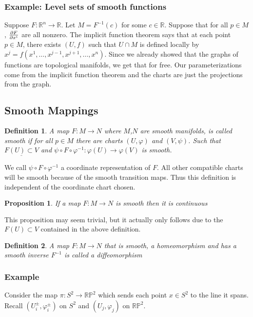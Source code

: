 \documentclass[a4paper]{article}
\newtheorem*{prop}{Proposition}
\newtheorem*{defn}{Definition}
\begin{document}
\subsubsection*{Example: Level sets of smooth functions}%
\label{ssub:Example: Level sets of smooth functions}
Suppose $F: \mathds{R}^n \rightarrow \mathds{R}$. Let $M = F^{-1}(c)$ for some $c \in \mathds{R}$. Suppose that for all $p \in M$, $\pdv{F}{x^i}$ are all nonzero. The implicit function theorem says that at each point $p \in M$, there exists $(U,f)$ such that $U \cap M$ is defined locally by $x^j = f(x^1, \dots, x^{j-1}, x^{j+1}, \dots, x^n)$. Since we already showed that the graphs of functions are topological manifolds, we get that for free. Our parameterizations come from the implicit function theorem and the charts are just the projections from the graph.

\subsection*{Smooth Mappings}%
\label{sub:Smooth Mappings}

\begin{defn}
  A map $F: M \rightarrow N$ where $M$,$N$ are smooth manifolds, is called smooth if for all $p \in M$ there are charts $(U, \varphi)$ and $(V, \psi)$.  Such that $\underline{F(U) \subset V}$ and $\psi \circ F \circ \varphi^{-1}: \varphi(U) \rightarrow \varphi(V)$ is smooth.
\end{defn}
We call $\psi \circ F \circ \varphi^{-1}$ a coordinate representation of $F$. All other compatible charts will be smooth because of the smooth transition maps. Thus this definition is independent of the coordinate chart chosen.
\begin{prop}
 If a map $F: M \rightarrow N$ is smooth then it is continuous 
\end{prop}
This proposition may seem trivial, but it actually only follows due to the $F(U) \subset V$ contained in the above definition.

\begin{defn}
  A map $F: M \rightarrow N$ that is smooth, a homeomorphism and has a smooth inverse $F^{-1}$ is called a diffeomorphism
\end{defn}

\subsubsection*{Example}%
Consider the map $\pi: S^2 \rightarrow \mathds{RP}^2$ which sends each point $x \in S^2$ to the line it spans. Recall $(U^\pm_i, \varphi^\pm_i)$ on $S^2$ and $(U_j, \varphi_j)$ on $\mathds{RP}^2$.
\end{document}
